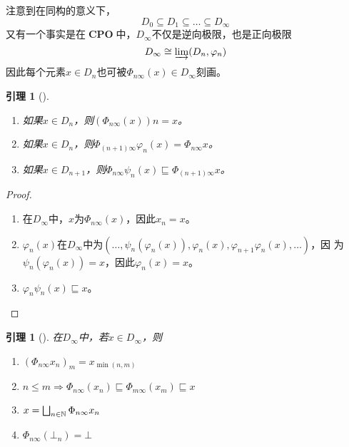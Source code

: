 \documentclass{jams-l}
\DeclareMathOperator{\CPO}{\textbf{CPO}}
\newtheorem{lemma}[theorem]{引理}
\begin{document}
注意到在同构的意义下，
\begin{equation*}
D_0\subseteq D_1\subseteq\dots\subseteq D_\infty
\end{equation*}
又有一个事实是在\(\CPO\)中，\(D_\infty\)不仅是逆向极限，也是正向极限
\begin{equation*}
D_\infty\cong\varinjlim(D_n,\varphi_n)
\end{equation*}
因此每个元素\(x\in D_n\)也可被\(\Phi_{n\infty}(x)\in D_\infty\)刻画。

\begin{lemma}[]
\label{18.2.7}
\begin{enumerate}
\item 如果\(x\in D_n\)，则\((\Phi_{n\infty}(x))n=x\)。
\item 如果\(x\in D_n\)，则\(\Phi_{(n+1)\infty}\varphi_n(x)=\Phi_{n\infty}x\)。
\item 如果\(x\in D_{n+1}\)，则\(\Phi_{n\infty}\psi_n(x)\sqsubseteq \Phi_{(n+1)\infty}x\)。
\end{enumerate}
\end{lemma}

\begin{proof}
\begin{enumerate}
\item 在\(D_\infty\)中，\(x\)为\(\Phi_{n\infty}(x)\)，因此\(x_n=x\)。
\item \(\varphi_n(x)\)在\(D_\infty\)中为\((\dots,\psi_n(\varphi_n(x)),\varphi_n(x),\varphi_{n+1}\varphi_n(x),\dots)\)，因
为\(\psi_n(\varphi_n(x))=x\)，因此\(\varphi_n(x)=x\)。
\item \(\varphi_n\psi_n(x)\sqsubseteq x\)。
\end{enumerate}
\end{proof}

\begin{lemma}[]
\label{18.2.8}
在\(D_\infty\)中，若\(x\in D_\infty\)，则
\begin{enumerate}
\item \((\Phi_{n\infty}x_n)_m=x_{\min(n,m)}\)
\item \(n\le m\Rightarrow \Phi_{n\infty}(x_n)\sqsubseteq\Phi_{m\infty}(x_m)\sqsubseteq x\)
\item \(x=\bigsqcup_{n\in\mathbb{N}}\Phi_{n\infty}x_n\)
\item \(\Phi_{n\infty}(\bot_n)=\bot\)
\end{enumerate}
\end{lemma}
\end{document}
